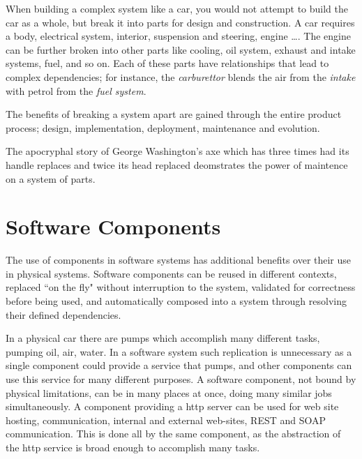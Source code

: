 When building a complex system like a car, you would not attempt to build the car as a whole, but break it into parts for design and construction.
A car requires a body, electrical system, interior, suspension and steering, engine \ldots. 
The engine can be further broken into other parts like cooling, oil system, exhaust and intake systems, fuel, and so on.
Each of these parts have relationships that lead to complex dependencies; for instance, the \textit{carburettor} blends the air from the \textit{intake} with petrol from the \textit{fuel system}.

The benefits of breaking a system apart are gained through the entire product process; design, implementation, deployment, maintenance and evolution.



The apocryphal story of George Washington's axe which has three times had its handle replaces and twice its head replaced deomstrates the power of maintence on a system of parts.


\section{Software Components}
{}The use of components in software systems has additional benefits over their use in physical systems.
{}Software components can be reused in different contexts, replaced ``on the fly" without interruption to the system, validated for correctness before being used, 
{}and automatically composed into a system through resolving their defined dependencies.

In a physical car there are pumps which accomplish many different tasks, pumping oil, air, water.
In a software system such replication is unnecessary as a single component could provide a service that pumps, 
and other components can use this service for many different purposes.
A software component, not bound by physical limitations, can be in many places at once, doing many similar jobs simultaneously.
A component providing a http server can be used for web site hosting, communication, internal and external web-sites, REST and SOAP communication.
This is done all by the same component, as the abstraction of the http service is broad enough to accomplish many tasks.

